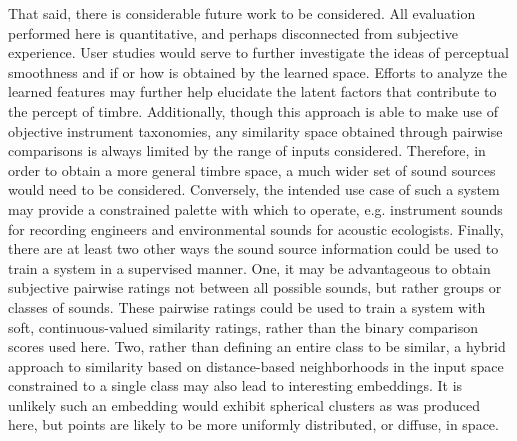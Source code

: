 That said, there is considerable future work to be considered.
All evaluation performed here is quantitative, and perhaps disconnected from subjective experience.
User studies would serve to further investigate the ideas of perceptual smoothness and if or how is obtained by the learned space.
Efforts to analyze the learned features may further help elucidate the latent factors that contribute to the percept of timbre.
Additionally, though this approach is able to make use of objective instrument taxonomies, any similarity space obtained through pairwise comparisons is always limited by the range of inputs considered.
Therefore, in order to obtain a more general timbre space, a much wider set of sound sources would need to be considered.
Conversely, the intended use case of such a system may provide a constrained palette with which to operate, e.g. instrument sounds for recording engineers and environmental sounds for acoustic ecologists.
Finally, there are at least two other ways the sound source information could be used to train a system in a supervised manner.
One, it may be advantageous to obtain subjective pairwise ratings not between all possible sounds, but rather groups or classes of sounds.
These pairwise ratings could be used to train a system with soft, continuous-valued similarity ratings, rather than the binary comparison scores used here.
Two, rather than defining an entire class to be similar, a hybrid approach to similarity based on distance-based neighborhoods in the input space constrained to a single class may also lead to interesting embeddings.
It is unlikely such an embedding would exhibit spherical clusters as was produced here, but points are likely to be more uniformly distributed, or diffuse, in space.
